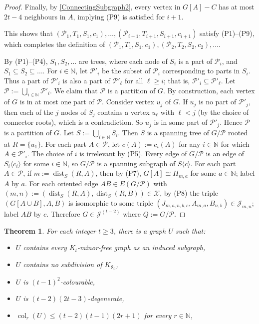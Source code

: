 \documentclass[a4paper,11pt]{article}
\theoremstyle{plain}
\newtheorem{thm}{Theorem}[section]
\theoremstyle{definition}
\renewcommand{\geq}{\geqslant}
\renewcommand{\leq}{\leqslant}
\DeclareMathOperator{\dist}{dist}
\DeclareMathOperator{\col}{col}
\newcommand{\XX}{\mathcal{X}}
\newcommand{\JJ}{\mathcal{J}}
\newcommand{\NN}{\mathbb{N}}
\newcommand{\PART}{\mathcal{P}}
\newcommand{\GGG}[2]{#1\langle{#2}\rangle}
\begin{document}
\begin{proof}
Finally, by \cref{ConnectingSubgraph2}, every vertex in $G[A]-C$ has at most $2t-4$ neighbours in $A$, implying (P9) is satisfied for $i+1$. 

This shows that $(\PART_1,T_1,S_1,c_1),\dots,(\PART_{i+1},T_{i+1},S_{i+1},c_{i+1})$ satisfy (P1)--(P9), which completes the definition of $(\PART_1,T_1,S_1,c_1),(\PART_2,T_2,S_2,c_2),\dots$.

By (P1)--(P4), $S_1,S_2,\dots$ are trees, where each node of $S_i$ is a part of $\PART_i$, and $S_1\subseteq S_2\subseteq \dots$. For $i\in\NN$, let $\PART'_i$ be the subset of $\PART_i$ corresponding to parts in $S_i$. Thus a part of $\PART'_i$ is also a part of $\PART'_\ell$ for all $\ell\geq i$; that is, $\PART'_i\subseteq \PART'_\ell$. Let $\PART:= \bigcup_{i\in\NN}\PART'_i$. We claim that $\PART$ is a partition of $G$. By construction, each vertex of $G$ is in at most one part of $\PART$. Consider vertex $u_j$ of $G$. If $u_j$ is no part of $\PART'_j$, then each of the $j$ nodes of $S_j$ contains a vertex $u_\ell$ with $\ell<j$ (by the choice of connector roots), which is a contradiction. So $u_j$ is in some part of $\PART'_j$. Hence $\PART$ is a partition of $G$. Let $S:=\bigcup_{i\in\NN}S_i$. Then $S$ is a spanning tree of $G/\PART$ rooted at $R=\{u_1\}$. For each part $A\in\PART$, let $c(A):=c_i(A)$ for any $i\in\NN$ for which $A\in\PART'_i$. The choice of $i$ is irrelevant by (P5). Every edge of $G/\PART$ is an edge of $\GGG{S_i}{c_i}$ for some $i\in\NN$, so $G/\PART$ is a spanning subgraph of $\GGG{S}{c}$. For each part $A\in \PART$, if $m:=\dist_S(R,A)$,  then by (P7), $G[A]\cong H_{m,a}$ for some $a\in \NN$; label $A$ by $a$. 
For each oriented edge $AB\in E(G/\PART)$ with $(m,n):=(\dist_S(R,A),\dist_S(R,B))\in\XX$, by (P8) the triple $(G[A\cup B],A,B)$ is isomorphic to some triple $(J_{m,a,n,b,c},A_{m,a},B_{n,b}) \in\JJ_{m,n}$; label $AB$ by $c$. Therefore $G\in\JJ^{(t-2)}$ where $Q:=G/\PART$.
\end{proof}

\begin{thm}
\label{KtMinorFreeNoSubdiv}
For each integer $t\geq 3$, there is a graph $U$ such that:
\begin{itemize}
\item $U$ contains every $K_t$-minor-free graph as an induced subgraph, 
\item $U$ contains no subdivision of $K_{\aleph_0}$,
\item $U$ is $(t-1)^2$-colourable, 
\item $U$ is $(t-2)(2t-3)$-degenerate, 
\item $\col_r(U) \leq (t-2)(t-1)(2r+1)$ for every $r\in\NN$, 
\end{itemize}
\end{thm}
\end{document}
